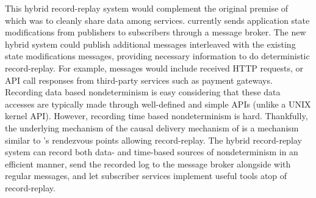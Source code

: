 This hybrid record-replay system would complement the original premise of
\synapse which was to cleanly share data among services. \synapse currently
sends application state modifications from publishers to subscribers through a
message broker. The new hybrid system could publish additional messages
interleaved with the existing state modifications messages, providing necessary
information to do deterministic record-replay. For example, messages would include
received HTTP requests, or API call responses from third-party services such as
payment gateways. Recording data based nondeterminism is easy considering that
these data accesses are typically made through well-defined and simple APIs
(unlike a UNIX kernel API). However, recording time based nondeterminism is hard.
Thankfully, the underlying mechanism of the causal delivery mechanism of \synapse
is a mechanism similar to \scribe's rendezvous points allowing record-replay.
The hybrid record-replay system can record both data- and time-based sources
of nondeterminism in an efficient manner, send the recorded log to the message
broker alongside with regular \synapse messages, and let subscriber services
implement useful tools atop of record-replay.

